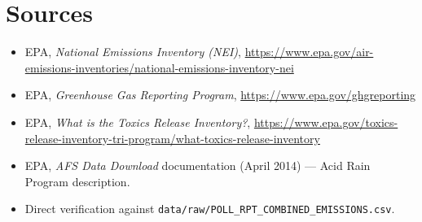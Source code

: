 \documentclass[11pt]{article}
\begin{document}
\section*{Sources}
\begin{itemize}
  \item EPA, \emph{National Emissions Inventory (NEI)},
  \url{https://www.epa.gov/air-emissions-inventories/national-emissions-inventory-nei}
  \item EPA, \emph{Greenhouse Gas Reporting Program}, \url{https://www.epa.gov/ghgreporting}
  \item EPA, \emph{What is the Toxics Release Inventory?},
  \url{https://www.epa.gov/toxics-release-inventory-tri-program/what-toxics-release-inventory}
  \item EPA, \emph{AFS Data Download} documentation (April 2014) --- Acid Rain Program description.
  \item Direct verification against \texttt{data/raw/POLL\_RPT\_COMBINED\_EMISSIONS.csv}.
\end{itemize}
\end{document}
